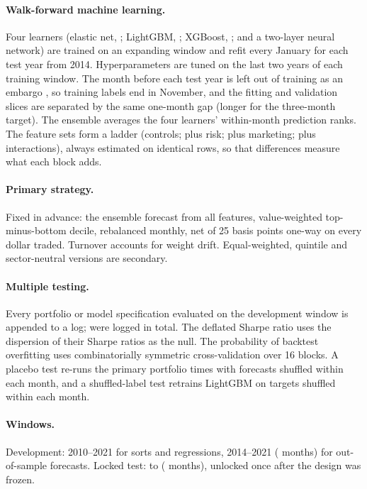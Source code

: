 \documentclass[11pt,a4paper]{article}
\begin{document}
\paragraph{Walk-forward machine learning.} Four learners (elastic net, \citealp{zou2005}; LightGBM, \citealp{ke2017};
XGBoost, \citealp{chen2016}; and a two-layer neural network) are trained on an expanding window and refit every January
for each test year from 2014. Hyperparameters are tuned on the last two years of each training window. The month before
each test year is left out of training as an embargo \citep{lopezdeprado2018}, so training labels end in November, and
the fitting and validation slices are separated by the same one-month gap (longer for the three-month target). The ensemble averages the four learners' within-month prediction ranks. The
feature sets form a ladder (controls; plus risk; plus marketing; plus interactions), always estimated on identical rows,
so that differences measure what each block adds.

\paragraph{Primary strategy.} Fixed in advance: the ensemble forecast from all features, value-weighted top-minus-bottom
decile, rebalanced monthly, net of 25 basis points one-way on every dollar traded. Turnover accounts for weight drift.
Equal-weighted, quintile and sector-neutral versions are secondary.

\paragraph{Multiple testing.} Every portfolio or model specification evaluated on the development window is appended to a
log; \SpecCount{} were logged in total. The deflated Sharpe ratio uses the dispersion of their Sharpe ratios as the null.
The probability of backtest overfitting uses combinatorially symmetric cross-validation over 16 blocks. A placebo test
re-runs the primary portfolio \PlaceboDraws{} times with forecasts shuffled within each month, and a shuffled-label test
retrains LightGBM on targets shuffled within each month.

\paragraph{Windows.} Development: 2010--2021 for sorts and regressions, 2014--2021 (\DevMonths{} months) for
out-of-sample forecasts. Locked test: \TestStart{} to \TestEnd{} (\TestMonths{} months), unlocked once after the
design was frozen.
\end{document}
